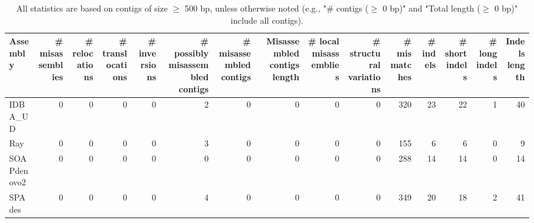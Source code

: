 \documentclass[12pt,a4paper]{article}
\begin{document}
\begin{table}[ht]
\begin{center}
\caption{All statistics are based on contigs of size $\geq$ 500 bp, unless otherwise noted (e.g., "\# contigs ($\geq$ 0 bp)" and "Total length ($\geq$ 0 bp)" include all contigs).}
\begin{tabular}{|l*{14}{|r}|}
\hline
Assembly & \# misassemblies &     \# relocations &     \# translocations &     \# inversions & \# possibly misassembled contigs & \# misassembled contigs & Misassembled contigs length & \# local misassemblies & \# structural variations & \# mismatches & \# indels &     \# short indels &     \# long indels & Indels length \\ \hline
IDBA\_UD & 0 & 0 & 0 & 0 & 2 & 0 & 0 & 0 & 0 & 320 & 23 & 22 & 1 & 40 \\ \hline
Ray & 0 & 0 & 0 & 0 & 3 & 0 & 0 & 0 & 0 & 155 & 6 & 6 & 0 & 9 \\ \hline
SOAPdenovo2 & 0 & 0 & 0 & 0 & 0 & 0 & 0 & 0 & 0 & 288 & 14 & 14 & 0 & 14 \\ \hline
SPAdes & 0 & 0 & 0 & 0 & 4 & 0 & 0 & 0 & 0 & 349 & 20 & 18 & 2 & 41 \\ \hline
\end{tabular}
\end{center}
\end{table}
\end{document}
